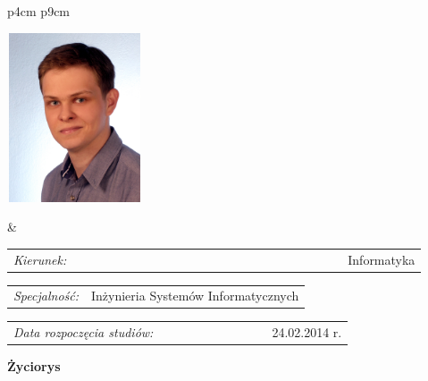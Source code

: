 \begin{titlepage}
\newpage\thispagestyle{empty}
\begin{tabular}{p{4cm} p{9cm}}
	\begin{minipage}{4cm}
		\begin{flushleft}
			\includegraphics[height=5.0cm,width=4.0cm]{img/profile.jpg}
		\end{flushleft}
	\end{minipage}
	&
	\begin{minipage}{12cm}
		\begin{flushleft}
			\par\noindent\vspace{1\baselineskip}
			\begin{tabular}[h]{l r}
				{\normalsize\it Kierunek:} & \ \ \ \ \ \ \ \ \ \ \ \ \ \ \ \ \ \ \ \ \ \ \ \ \ \ \ \ \ \ \ \ \ \ \ \ \ \ \ \ \ \ \ Informatyka
			\end{tabular}
			\par\noindent\vspace{1\baselineskip}
			\begin{tabular}[h]{l r}
				{\normalsize\it Specjalność:} & Inżynieria Systemów Informatycznych
			\end{tabular}
			\par\noindent\vspace{1\baselineskip}
			\begin{tabular}[h]{l r}
				{\normalsize\it Data rozpoczęcia studiów:} & {\normalsize \ \ \ \ \ \ \ \ \ \ \ \ \ \ \ \ \ 24.02.2014 r.}
			\end{tabular}
			\par\noindent\vspace{1\baselineskip}
		\end{flushleft}
	\end{minipage}
\end{tabular}

\vspace*{1\baselineskip}
\begin{center}
{\large\bfseries Życiorys}\par\bigskip
\end{center}


\end{titlepage}
